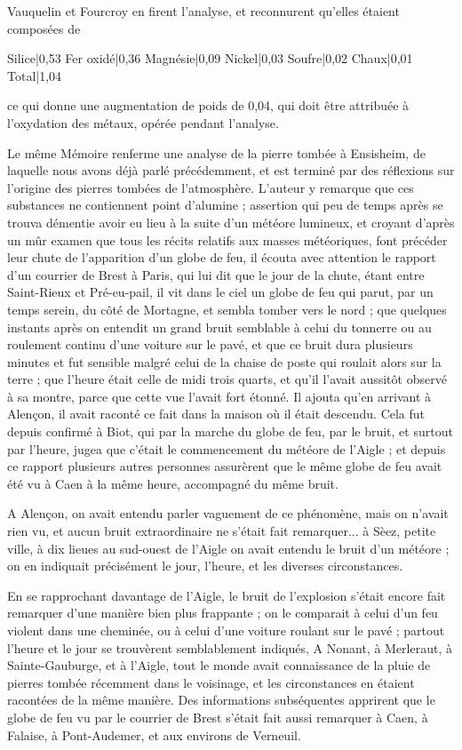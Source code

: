 \documentclass[a4paper, 12pt, oneside, french]{article}
\begin{document}
Vauquelin et Fourcroy en firent l'analyse, et reconnurent qu'elles étaient composées de

Silice|0,53  
Fer oxidé|0,36  
Magnésie|0,09  
Nickel|0,03  
Soufre|0,02  
Chaux|0,01  
Total|1,04

ce qui donne une augmentation de poids de 0,04, qui doit être attribuée à l'oxydation des métaux, opérée pendant l'analyse.

Le même Mémoire renferme une analyse de la pierre tombée à Ensisheim, de laquelle nous avons déjà parlé précédemment, et est terminé par des réflexions sur l'origine des pierres tombées de l'atmosphère. L'auteur y remarque que ces substances ne contiennent point d'alumine ; assertion qui peu de temps après se trouva démentie avoir eu lieu à la suite d'un météore lumineux, et croyant d'après un mûr examen que tous les récits relatifs aux masses météoriques, font précéder leur chute de l'apparition d'un globe de feu, il écouta avec attention le rapport d'un courrier de Brest à Paris, qui lui dit que le jour de la chute, étant entre Saint-Rieux et Pré-eu-pail, il vit dans le ciel un globe de feu qui parut, par un temps serein, du côté de Mortagne, et sembla tomber vers le nord ; que quelques instants après on entendit un grand bruit semblable à celui du tonnerre ou au roulement continu d'une voiture sur le pavé, et que ce bruit dura plusieurs minutes et fut sensible malgré celui de la chaise de poste qui roulait alors sur la terre ; que l'heure était celle de midi trois quarts, et qu'il l'avait aussitôt observé à sa montre, parce que cette vue l'avait fort étonné. Il ajouta qu'en arrivant à Alençon, il avait raconté ce fait dans la maison où il était descendu. Cela fut depuis confirmé à Biot, qui par la marche du globe de feu, par le bruit, et surtout par l'heure, jugea que c'était le commencement du météore de l'Aigle ; et depuis ce rapport plusieurs autres personnes assurèrent que le même globe de feu avait été vu à Caen à la même heure, accompagné du même bruit.

A Alençon, on avait entendu parler vaguement de ce phénomène, mais on n'avait rien vu, et aucun bruit extraordinaire ne s'était fait remarquer... à Sèez, petite ville, à dix lieues au sud-ouest de l'Aigle on avait entendu le bruit d'un météore ; on en indiquait précisément le jour, l'heure, et les diverses circonstances.

En se rapprochant davantage de l'Aigle, le bruit de l'explosion s'était encore fait remarquer d'une manière bien plus frappante ; on le comparait à celui d'un feu violent dans une cheminée, ou à celui d'une voiture roulant sur le pavé ; partout l'heure et le jour se trouvèrent semblablement indiqués, A Nonant, à Merleraut, à Sainte-Gauburge, et à l'Aigle, tout le monde avait connaissance de la pluie de pierres tombée récemment dans le voisinage, et les circonstances en étaient racontées de la même manière. Des informations subséquentes apprirent que le globe de feu vu par le courrier de Brest s'était fait aussi remarquer à Caen, à Falaise, à Pont-Audemer, et aux environs de Verneuil.
\end{document}

